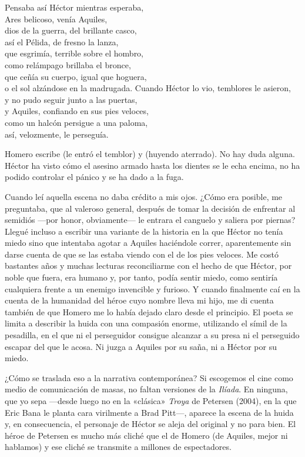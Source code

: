 \begin{versocita}
Pensaba así Héctor mientras esperaba,\\
Ares belicoso, venía Aquiles,\\
dios de la guerra, del brillante casco,\\
así el Pélida, de fresno la lanza,\\
que esgrimía, terrible sobre el hombro,\\
como relámpago brillaba el bronce,\\
que ceñía su cuerpo, igual que hoguera,\\
o el sol alzándose en la madrugada.
\stanzabreak
Cuando Héctor lo vio, temblores le asieron,\\
y no pudo seguir junto a las puertas,\\
y Aquiles, confiando en sus pies veloces,\\
como un halcón persigue a una paloma,\\
así, velozmente, le perseguía.
\end{versocita}

Homero escribe  (le entró el temblor) y  (huyendo aterrado). No hay duda alguna. Héctor ha visto cómo el asesino armado hasta los dientes se le echa encima, no ha podido controlar el pánico y se ha dado a la fuga.

Cuando leí aquella escena no daba crédito a mis ojos. ¿Cómo era posible, me preguntaba, que al valeroso general, después de tomar la decisión de enfrentar al semidiós ---por honor, obviamente--- le entrara el canguelo y saliera por piernas? Llegué incluso a escribir una variante de la historia en la que Héctor no tenía miedo sino que intentaba agotar a Aquiles haciéndole correr, aparentemente sin darse cuenta de que se las estaba viendo con el de los pies veloces. Me costó bastantes años y muchas lecturas reconciliarme con el hecho de que Héctor, por noble que fuera, era humano y, por tanto, podía sentir miedo, como sentiría cualquiera frente a un enemigo invencible y furioso. Y cuando finalmente caí en la cuenta de la humanidad del héroe cuyo nombre lleva mi hijo, me di cuenta también de que Homero me lo había dejado claro desde el principio. El poeta se limita a describir la huida con una compasión enorme, utilizando el símil de la pesadilla, en el que ni el perseguidor consigue alcanzar a su presa ni el perseguido escapar del que le acosa. Ni juzga a Aquiles por su saña, ni a Héctor por su miedo.

¿Cómo se traslada eso a la narrativa contemporánea? Si escogemos el cine como medio de comunicación de masas, no faltan versiones de la \emph{Ilíada}. En ninguna, que yo sepa ---desde luego no en la «clásica» \emph{Troya} de Petersen (2004), en la que Eric Bana le planta cara virilmente a Brad Pitt---, aparece la escena de la huida y, en consecuencia, el personaje de Héctor se aleja del original y no para bien. El héroe de Petersen es mucho más cliché que el de Homero (de Aquiles, mejor ni hablamos) y ese cliché se transmite a millones de espectadores.

